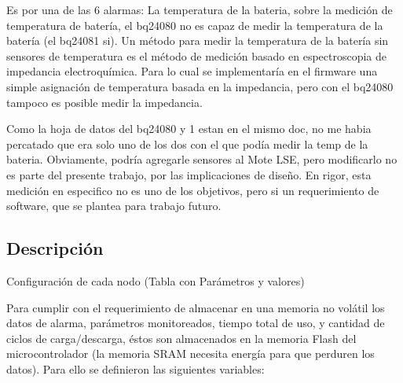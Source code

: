 {Es por una de las 6 alarmas: La temperatura de la bateria, sobre la medición de temperatura de batería, el bq24080 no es capaz de medir la temperatura de la batería (el bq24081 si). Un método para medir la temperatura de la batería sin sensores de temperatura es el método de medición basado en espectroscopia de impedancia electroquímica\citep{metodo}. Para lo cual se implementaría en el firmware una simple asignación de temperatura basada en la impedancia, pero con el bq24080 tampoco es posible medir la impedancia.

Como la hoja de datos del bq24080 y 1 estan en el mismo doc, no me habia percatado que era solo uno de los dos con el que podía medir la temp de la bateria.
Obviamente, podría agregarle sensores al Mote LSE, pero modificarlo no es parte del presente trabajo, por las implicaciones de diseño.
En rigor, esta medición en especifico no es uno de los objetivos, pero si un requerimiento de software, que se plantea para trabajo futuro.



\subsection{Descripción}
\label{subsec:desc} 

Configuración de cada nodo (Tabla con Parámetros y valores)

Para cumplir con el requerimiento de almacenar en una memoria no volátil los datos de alarma, parámetros monitoreados, tiempo total de uso, y cantidad de ciclos de carga/descarga, éstos son almacenados en la memoria Flash del microcontrolador (la memoria SRAM necesita energía para que perduren los datos). Para ello se definieron las siguientes variables:
    

}
